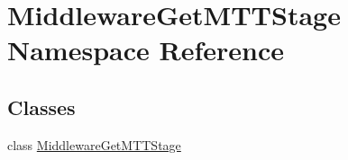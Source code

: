 \hypertarget{namespaceMiddlewareGetMTTStage}{\section{Middleware\-Get\-M\-T\-T\-Stage Namespace Reference}
\label{namespaceMiddlewareGetMTTStage}
}
\subsection*{Classes}
\begin{DoxyCompactItemize}
\item 
class \hyperlink{classMiddlewareGetMTTStage_1_1MiddlewareGetMTTStage}{Middleware\-Get\-M\-T\-T\-Stage}
\end{DoxyCompactItemize}
